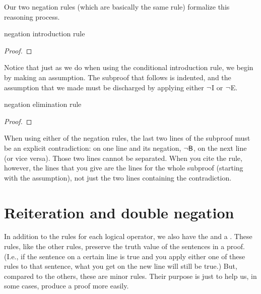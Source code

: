 Our two negation rules (which are basically the same rule) formalize this reasoning process.

\begin{factboxy}{negation introduction rule}
\begin{proof}
\open
	\as{}
\close
{}
\end{proof}
\end{factboxy}

\noindent Notice that just as we do when using the conditional introduction rule, we begin by making an assumption. The subproof that follows is indented, and the assumption that we made must be discharged by applying either ${\neg}$I or ${\neg}$E.

\begin{factboxy}{negation elimination rule}
\begin{proof}
\open
	\as{}
\close
{}
\end{proof}
\end{factboxy}

When using either of the negation rules, the last two lines of the subproof must be an explicit contradiction:  on one line and its negation, ${\neg}\mathsf{B}$, on the next line (or vice versa). Those two lines cannot be separated. When you cite the rule, however, the lines that you give are the lines for the whole subproof (starting with the assumption), not just the two lines containing the contradiction. 



\section{Reiteration and double negation}
In addition to the rules for each logical operator, we also have the  and a . These rules, like the other rules, preserve the truth value of the sentences in a proof. (I.e., if the sentence on a certain line is true and you apply either one of these rules to that sentence, what you get on the new line will still be true.) But, compared to the others, these are minor rules. Their purpose is just to help us, in some cases, produce a proof more easily. 

